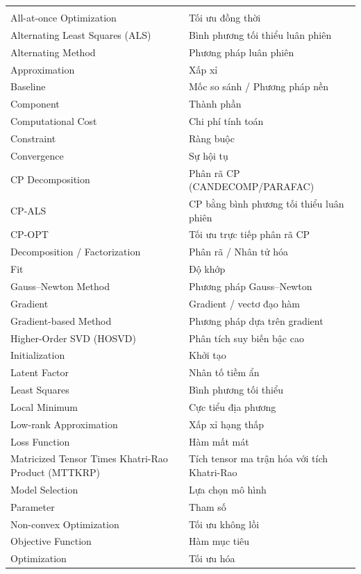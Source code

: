 \begin{longtable}{L{0.42\textwidth}L{0.48\textwidth}}
\addlinespace
{} \\
All-at-once Optimization & Tối ưu đồng thời \\
Alternating Least Squares (ALS) & Bình phương tối thiểu luân phiên \\
Alternating Method & Phương pháp luân phiên \\
Approximation & Xấp xỉ \\
Baseline & Mốc so sánh / Phương pháp nền \\
Component & Thành phần \\
Computational Cost & Chi phí tính toán \\
Constraint & Ràng buộc \\
Convergence & Sự hội tụ \\
CP Decomposition & Phân rã CP (CANDECOMP/PARAFAC) \\
CP-ALS & CP bằng bình phương tối thiểu luân phiên \\
CP-OPT & Tối ưu trực tiếp phân rã CP \\
Decomposition / Factorization & Phân rã / Nhân tử hóa \\
Fit & Độ khớp \\
Gauss--Newton Method & Phương pháp Gauss--Newton \\
Gradient & Gradient / vectơ đạo hàm \\
Gradient-based Method & Phương pháp dựa trên gradient \\
Higher-Order SVD (HOSVD) & Phân tích suy biến bậc cao \\
Initialization & Khởi tạo \\
Latent Factor & Nhân tố tiềm ẩn \\
Least Squares & Bình phương tối thiểu \\
Local Minimum & Cực tiểu địa phương \\
Low-rank Approximation & Xấp xỉ hạng thấp \\
Loss Function & Hàm mất mát \\
Matricized Tensor Times Khatri-Rao Product (MTTKRP) & Tích tensor ma trận hóa với tích Khatri-Rao \\
Model Selection & Lựa chọn mô hình \\
Parameter & Tham số \\
Non-convex Optimization & Tối ưu không lồi \\
Objective Function & Hàm mục tiêu \\
Optimization & Tối ưu hóa \\

\end{longtable}
